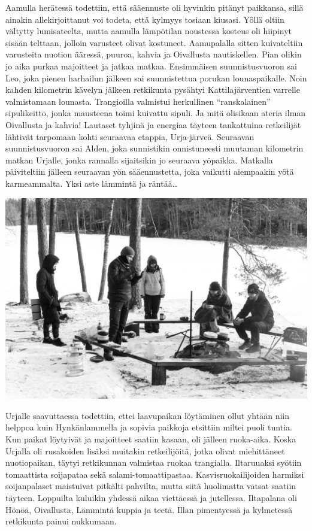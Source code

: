 \begin{multicols}{2}
Aamulla herätessä todettiin, että sääennuste oli hyvinkin pitänyt paikkansa,
sillä ainakin allekirjoittanut voi todeta, että kylmyys tosiaan kiusasi. Yöllä
oltiin vältytty lumisateelta, mutta aamulla lämpötilan noustessa kosteus oli
hiipinyt sisään telttaan, jolloin varusteet olivat kostuneet. Aamupalalla
sitten kuivateltiin varusteita nuotion ääressä, puuroa, kahvia ja Oivallusta
nautiskellen. Pian olikin jo aika purkaa majoitteet ja jatkaa matkaa.
Ensimmäisen suunnistusvuoron sai Leo, joka pienen harhailun jälkeen sai
suunnistettua porukan lounaspaikalle. Noin kahden kilometrin kävelyn jälkeen
retkikunta pysähtyi Kattilajärventien varrelle valmistamaan lounasta.
Trangioilla valmistui herkullinen “ranskalainen” sipulikeitto, jonka mausteena
toimi kuivattu sipuli. Ja mitä olisikaan ateria ilman Oivallusta ja kahvia!
Lautaset tyhjinä ja energiaa täyteen tankattuina retkeilijät lähtivät tarpomaan
kohti seuraavaa etappia, Urja-järveä. Seuraavan suunnistusvuoron sai Alden,
joka sunnistikin onnistuneesti muutaman kilometrin matkan Urjalle, jonka
rannalla sijaitsikin jo seuraava yöpaikka. Matkalla päiviteltiin jälleen
seuraavan yön sääennustetta, joka vaikutti aiempaakin yötä karmeammalta. Yksi
aste lämmintä ja räntää…

\bigskip
\noindent\includegraphics[width=1.0\linewidth,trim={0 0 0 0},clip]{assets/minihaikki6}
\smallskip

Urjalle saavuttaessa todettiin, ettei laavupaikan löytäminen ollut yhtään niin
helppoa kuin Hynkänlammella ja sopivia paikkoja etsittiin miltei puoli tuntia.
Kun paikat löytyivät ja majoitteet saatiin kasaan, oli jälleen ruoka-aika.
Koska Urjalla oli rusakoiden lisäksi muitakin retkeilijöitä, jotka olivat
miehittäneet nuotiopaikan, täytyi retkikunnan valmistaa ruokaa trangialla.
Iltaruuaksi syötiin tomaattista soijapataa sekä salami-tomaattipastaa.
Kasvisruokailijoiden harmiksi soijanpalaset maistuivat pitkälti pahvilta, mutta
siitä huolimatta vatsat saatiin täyteen. Loppuilta kuluikin yhdessä aikaa
viettäessä ja jutellessa. Iltapalana oli Hönöä, Oivallusta, Lämmintä kuppia ja
teetä. Illan pimentyessä ja kylmetessä retkikunta painui nukkumaan.


\end{multicols}
